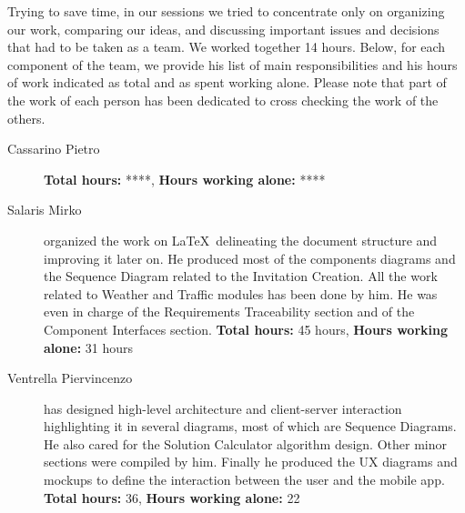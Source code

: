 Trying to save time, in our sessions we tried to concentrate only on organizing our work, comparing our ideas, and discussing important issues and decisions that had to be taken as a team. We worked together 14 hours.
\newline
Below, for each component of the team, we provide his list of main responsibilities and his hours of work indicated as total and as spent working alone. Please note that part of the work of each person has been dedicated to cross checking the work of the others.
\begin{description}
	\item[Cassarino Pietro]
		\textbf{Total hours:} ****, \textbf{Hours working alone:} ****
	\item[Salaris Mirko]
		organized the work on \LaTeX\ delineating the document structure and improving it later on. He produced most of the components diagrams and the Sequence Diagram related to the Invitation Creation. All the work related to Weather and Traffic modules has been done by him. He was even in charge of the Requirements Traceability section and of the Component Interfaces section.
		\newline
		\textbf{Total hours:} 45 hours, \textbf{Hours working alone:} 31 hours
	\item[Ventrella Piervincenzo]
	has designed high-level architecture and client-server interaction highlighting it in several diagrams, most of which are Sequence Diagrams. He also cared for the Solution Calculator algorithm design. Other minor sections were compiled by him.
	Finally he produced the UX diagrams and mockups to define the interaction between the user and the mobile app.
		\textbf{Total hours:} 36, \textbf{Hours working alone:} 22
\end{description}